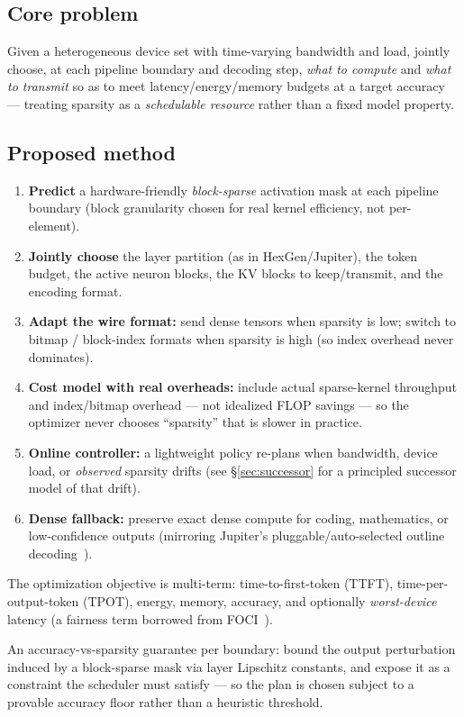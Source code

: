 \documentclass[11pt]{article}
\begin{document}
\subsection*{Core problem}
Given a heterogeneous device set with time-varying bandwidth and load, jointly choose, at
each pipeline boundary and decoding step, \emph{what to compute} and \emph{what to transmit}
so as to meet latency/energy/memory budgets at a target accuracy --- treating sparsity as a
\emph{schedulable resource} rather than a fixed model property.

\subsection*{Proposed method}
\begin{enumerate}[leftmargin=1.5em,itemsep=1pt]
\item \textbf{Predict} a hardware-friendly \emph{block-sparse} activation mask at each pipeline boundary (block granularity chosen for real kernel efficiency, not per-element).
\item \textbf{Jointly choose} the layer partition (as in HexGen/Jupiter), the token budget, the active neuron blocks, the KV blocks to keep/transmit, and the encoding format.
\item \textbf{Adapt the wire format:} send dense tensors when sparsity is low; switch to bitmap / block-index formats when sparsity is high (so index overhead never dominates).
\item \textbf{Cost model with real overheads:} include actual sparse-kernel throughput and index/bitmap overhead --- not idealized FLOP savings --- so the optimizer never chooses ``sparsity'' that is slower in practice.
\item \textbf{Online controller:} a lightweight policy re-plans when bandwidth, device load, or \emph{observed} sparsity drifts (see \S\ref{sec:successor} for a principled successor model of that drift).
\item \textbf{Dense fallback:} preserve exact dense compute for coding, mathematics, or low-confidence outputs (mirroring Jupiter's pluggable/auto-selected outline decoding~\cite{jupiter}).
\end{enumerate}
The optimization objective is multi-term: time-to-first-token (TTFT), time-per-output-token
(TPOT), energy, memory, accuracy, and optionally \emph{worst-device} latency (a fairness
term borrowed from FOCI~\cite{foci}).

\begin{theorybox}
An accuracy-vs-sparsity guarantee per boundary: bound the output perturbation induced by a
block-sparse mask via layer Lipschitz constants, and expose it as a constraint the scheduler
must satisfy --- so the plan is chosen subject to a provable accuracy floor rather than a
heuristic threshold.
\end{theorybox}
\end{document}
